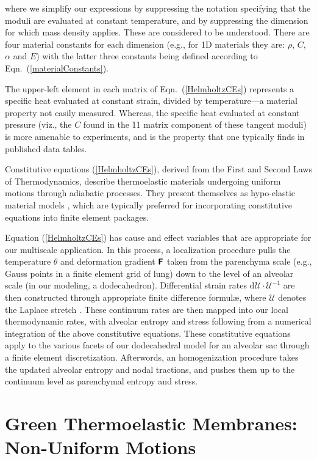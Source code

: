 where we simplify our expressions by suppressing the notation specifying that the moduli are evaluated at constant temperature, and by suppressing the dimension for which mass density applies.  These are considered to be understood.  There are four material constants for each dimension (e.g., for 1D materials they are: $\rho$, $C$, $\alpha$ and $E$) with the latter three constants being defined according to Eqn.~(\ref{materialConstants}).

The upper-left element in each matrix of Eqn.~(\ref{HelmholtzCEs}) represents a specific heat evaluated at constant strain, divided by temperature---a material property not easily measured.  Whereas, the specific heat evaluated at constant pressure (viz., the $C$ found in the 11 matrix component of these tangent moduli) is more amenable to experiments, and is the property that one typically finds in published data tables.  

Constitutive equations (\ref{HelmholtzCEs}), derived from the First and Second Laws of Thermo\-dynamics, describe thermo\-elastic materials undergoing uniform motions through adiabatic processes.  They present themselves as hypo-elastic material models \cite{Truesdell55}, which are typically preferred for incorporating constitutive equations into finite element packages.

Equation (\ref{HelmholtzCEs}) has cause and effect variables that are appropriate for our multi\-scale application.  In this process, a localization procedure pulls the temperature $\theta$ and deformation gradient $\boldsymbol{\mathsf{F}}$ taken from the parenchyma scale (e.g., Gauss points in a finite element grid of lung) down to the level of an alveolar scale (in our modeling, a dodecahedron).  Differential strain rates $\mathrm{d} \boldsymbol{\mathcal{U}} \cdot \boldsymbol{\mathcal{U}}^{-1}$ are then constructed through appropriate finite difference formul\ae, where $\boldsymbol{\mathcal{U}}$ denotes the Laplace stretch \cite{Freedetal19}. These continuum rates are then mapped into our local thermo\-dynamic rates, with alveolar entropy and stress following from a numerical integration of the above constitutive equations.  These constitutive equations apply to the various facets of our dodecahedral model for an alveolar sac through a finite element discretization.  Afterwords, an homogenization procedure takes the updated alveolar entropy and nodal tractions, and pushes them up to the continuum level as parenchymal entropy and stress. 

\section{Green Thermoelastic Membranes: Non-Uniform Motions}
\label{secNonuniform2D}

